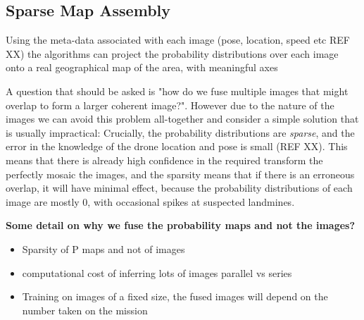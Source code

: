 \subsection{Sparse Map Assembly} \label{orthomosaic}

    Using the meta-data associated with each image (pose, location, speed etc REF XX) the algorithms can project the probability distributions over each image onto a real geographical map of the area, with meaningful axes
    
    
     A question that should be asked is "how do we fuse multiple images that might overlap to form a larger coherent image?". However due to the nature of the images we can avoid this problem all-together and consider a simple solution that is usually impractical: Crucially, the probability distributions are \textit{sparse}, and the error in the knowledge of the drone location and pose is small (REF XX). This means that there is already high confidence in the required transform the perfectly mosaic the images, and the sparsity means that if there is an erroneous overlap, it will have minimal effect, because the probability distributions of each image are mostly 0, with occasional spikes at suspected landmines.
    
    \textbf{Some detail on why we fuse the probability maps and not the images?}
    \begin{itemize}
        \item Sparsity of P maps and not of images
        \item computational cost of inferring lots of images parallel vs series
        \item Training on images of a fixed size, the fused images will depend on the number taken on the mission 
    \end{itemize}
    